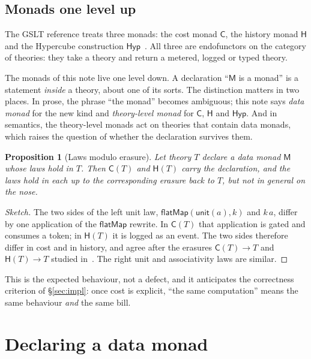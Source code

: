 \documentclass[11pt]{article}
\theoremstyle{definition}
\theoremstyle{plain}
\newtheorem{proposition}[definition]{Proposition}
\theoremstyle{remark}
\newcommand{\M}{\mathsf{M}}
\newcommand{\unit}{\mathsf{unit}}
\newcommand{\bind}{\mathsf{flatMap}}
\newcommand{\cost}{\mathsf{C}}
\newcommand{\hist}{\mathsf{H}}
\newcommand{\hyp}{\mathsf{Hyp}}
\begin{document}
\subsection{Monads one level up}

The GSLT reference treats three monads: the cost monad \(\cost\), the history
monad \(\hist\) and the Hypercube construction \(\hyp\)~\cite{GSLTintro,
CostMonad, History, Hypercube}. All three are endofunctors on the category of
theories: they take a theory and return a metered, logged or typed theory.

The monads of this note live one level down. A declaration
``\(\M\) is a monad'' is a statement \emph{inside} a theory, about one of its
sorts. The distinction matters in two places. In prose, the phrase ``the
monad'' becomes ambiguous; this note says \emph{data monad} for the new kind and
\emph{theory-level monad} for \(\cost\), \(\hist\) and \(\hyp\). And in
semantics, the theory-level monads act on theories that contain data monads,
which raises the question of whether the declaration survives them.

\begin{proposition}[Laws modulo erasure]
\label{prop:modulo-erasure}
Let theory \(T\) declare a data monad \(\M\) whose laws hold in \(T\). Then
\(\cost(T)\) and \(\hist(T)\) carry the declaration, and the laws hold in each
up to the corresponding erasure back to \(T\), but not in general on the nose.
\end{proposition}

\begin{proof}[Sketch]
The two sides of the left unit law,
\(\bind(\unit(a), k)\) and \(k\,a\), differ by one application of the
\(\bind\) rewrite. In \(\cost(T)\) that application is gated and consumes a
token; in \(\hist(T)\) it is logged as an event. The two sides therefore differ
in cost and in history, and agree after the erasures \(\cost(T)\to T\) and
\(\hist(T)\to T\) studied in~\cite{TwoErasures}. The right unit and
associativity laws are similar.
\end{proof}

This is the expected behaviour, not a defect, and it anticipates the
correctness criterion of \S\ref{sec:impl}: once cost is explicit, ``the same
computation'' means the same behaviour \emph{and} the same bill.

\section{Declaring a data monad}
\label{sec:ddl}
\end{document}
